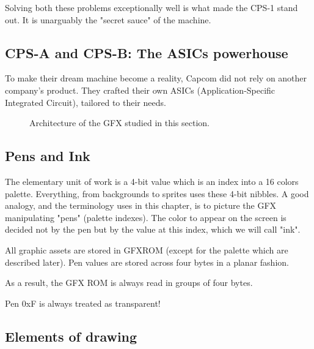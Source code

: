 Solving both these problems exceptionally well is what made the CPS-1 stand out. It is unarguably the "secret sauce" of the machine. 

\subsection{CPS-A and CPS-B: The ASICs powerhouse}
To make their dream machine become a reality, Capcom did not rely on another company's product. They crafted their own ASICs (Application-Specific Integrated Circuit), tailored to their needs.


\begin{figure}[H]
\caption*{Architecture of the GFX studied in this section.}
\end{figure}




\subsection{Pens and Ink}
The elementary unit of work is a 4-bit value which is an index into a 16 colors palette. Everything, from backgrounds to sprites uses these 4-bit nibbles. A good analogy, and the terminology uses in this chapter, is to picture the GFX manipulating "pens" (palette indexes). The color to appear on the screen is decided not by the pen but by the value at this index, which we will call "ink".


All graphic assets are stored in GFXROM (except for the palette which are described later). Pen values are stored across four bytes in a planar fashion.






As a result, the GFX ROM is always read in groups of four bytes.

 \begin{trivia}
 Pen 0xF is always treated as transparent!
 \end{trivia}



\subsection{Elements of drawing}


